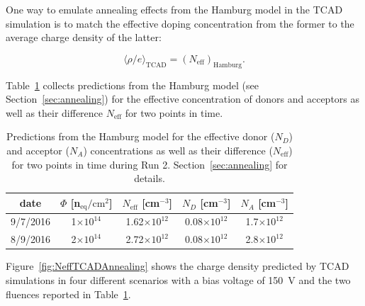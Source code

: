 One way to emulate annealing effects from the Hamburg model in the TCAD simulation is to match the effective doping concentration from the former to the average charge density of the latter: 

\begin{equation}
\langle \rho/e\rangle_\text{TCAD}=(N_\text{eff})_\text{Hamburg}.
\label{eq:SpaceChargeTCADHamburg}
\end{equation}

Table~\ref{tab:NeffHamburg} collects predictions from the Hamburg model (see Section~\ref{sec:annealing}) for the effective concentration of donors and acceptors as well as their difference $N_\text{eff}$ for two points in time. 

\begin{table}[!htpb]
\caption{\label{tab:NeffHamburg}Predictions from the Hamburg model for the effective donor ($N_D$) and acceptor ($N_A$) concentrations as well as their difference ($N_\text{eff}$) for two points in time during Run 2.  Section~\ref{sec:annealing} for details.}
\centering
\begin{tabular}{ccccc}
  \hline
   date & $\Phi$ [n$_\text{eq}/\text{cm}^{2}$] & $N_\text{eff}$ [cm$^{-3}$] 
   & $N_D$ [cm$^{-3}$]	& $N_A$ [cm$^{-3}$]	\\
   \hline
   \hline	
  9/7/2016 & 1$\times10^{14}$ & 1.62$\times10^{12}$ & 0.08$\times10^{12}$ & 1.7$\times10^{12}$ \\
 8/9/2016 & 2$\times10^{14}$ & 2.72$\times10^{12}$ & 0.08$\times10^{12}$ & 2.8$\times10^{12}$\\
  \hline  
\end{tabular}
\end{table}

Figure~\ref{fig:NeffTCADAnnealing} shows the charge density predicted by TCAD simulations in four 
different scenarios with a bias voltage of 150~V and the two fluences reported in Table~\ref{tab:NeffHamburg}.  

